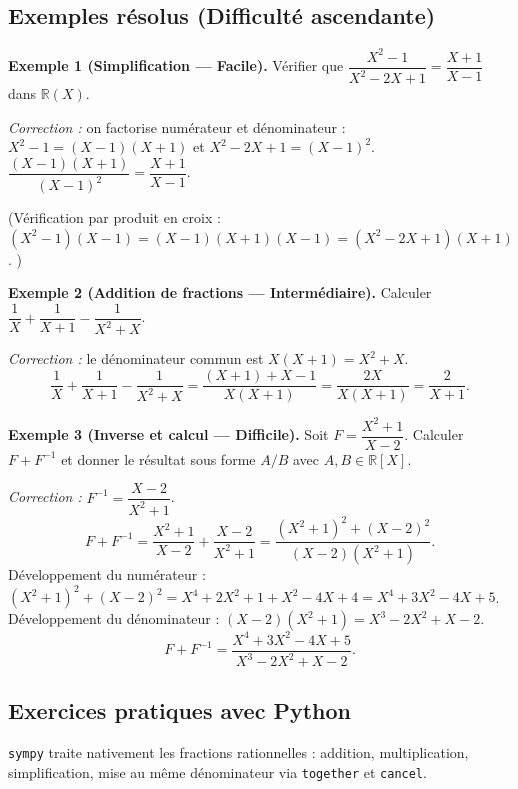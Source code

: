 \documentclass[12pt,a4paper]{report}
\theoremstyle{definition}
\theoremstyle{remark}
\begin{document}
\subsection{Exemples résolus (Difficulté ascendante)}

\textbf{Exemple 1 (Simplification --- Facile).}
Vérifier que $\dfrac{X^2 - 1}{X^2 - 2X + 1} = \dfrac{X + 1}{X - 1}$ dans $\mathbb{R}(X)$.

\textit{Correction :} on factorise numérateur et dénominateur :
$X^2 - 1 = (X - 1)(X + 1)$ et $X^2 - 2X + 1 = (X - 1)^2$.
$\dfrac{(X-1)(X+1)}{(X-1)^2} = \dfrac{X + 1}{X - 1}$. \checkmark

(Vérification par produit en croix : $(X^2 - 1)(X - 1) = (X - 1)(X + 1)(X - 1) = (X^2 - 2X + 1)(X + 1)$. \checkmark)

\medskip

\textbf{Exemple 2 (Addition de fractions --- Intermédiaire).}
Calculer $\dfrac{1}{X} + \dfrac{1}{X + 1} - \dfrac{1}{X^2 + X}$.

\textit{Correction :} le dénominateur commun est $X(X + 1) = X^2 + X$.
\[ \frac{1}{X} + \frac{1}{X+1} - \frac{1}{X^2 + X} = \frac{(X + 1) + X - 1}{X(X + 1)} = \frac{2X}{X(X+1)} = \frac{2}{X + 1}. \]

\medskip

\textbf{Exemple 3 (Inverse et calcul --- Difficile).}
Soit $F = \dfrac{X^2 + 1}{X - 2}$. Calculer $F + F^{-1}$ et donner le résultat sous forme $A/B$ avec $A, B \in \mathbb{R}[X]$.

\textit{Correction :} $F^{-1} = \dfrac{X - 2}{X^2 + 1}$.
\[ F + F^{-1} = \frac{X^2 + 1}{X - 2} + \frac{X - 2}{X^2 + 1} = \frac{(X^2 + 1)^2 + (X - 2)^2}{(X - 2)(X^2 + 1)}. \]
Développement du numérateur : $(X^2 + 1)^2 + (X - 2)^2 = X^4 + 2X^2 + 1 + X^2 - 4X + 4 = X^4 + 3X^2 - 4X + 5$.
Développement du dénominateur : $(X - 2)(X^2 + 1) = X^3 - 2X^2 + X - 2$.
\[ F + F^{-1} = \frac{X^4 + 3X^2 - 4X + 5}{X^3 - 2X^2 + X - 2}. \]

\subsection{Exercices pratiques avec Python}
\texttt{sympy} traite nativement les fractions rationnelles : addition, multiplication, simplification, mise au même dénominateur via \texttt{together} et \texttt{cancel}.
\end{document}
